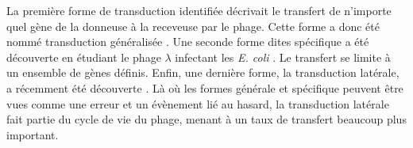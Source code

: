 La première forme de transduction identifiée décrivait le transfert de n'importe quel gène de la donneuse à la receveuse par le phage. Cette forme a donc été nommé transduction généralisée \cite{zinder_genetic_1952}. Une seconde forme dites spécifique a été découverte en étudiant le phage $\lambda$ infectant les \textit{E. coli} \cite{morse_transduction_1956}. Le transfert se limite à un ensemble de gènes définis. Enfin, une dernière forme, la transduction latérale, a récemment été découverte \cite{chen_genome_2018}. Là où les formes générale et spécifique peuvent être vues comme une erreur et un évènement lié au hasard, la transduction latérale fait partie du cycle de vie du phage, menant à un taux de transfert beaucoup plus important. 
